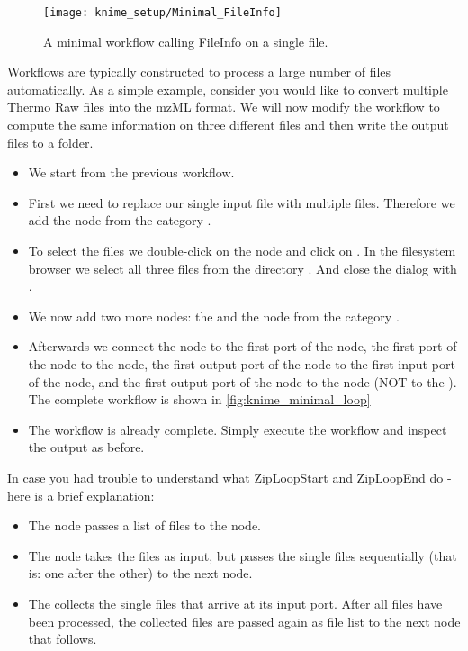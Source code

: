 \begin{figure}
\centering
\texttt{[image: knime\_setup/Minimal\_FileInfo]}
\caption{A minimal workflow calling FileInfo on a single file.}
\label{fig:knime_minimal}
\end{figure}


Workflows are typically constructed to process a large number of files automatically.
As a simple example, consider you would like to convert multiple Thermo Raw files into the mzML format.
We will now modify the workflow to compute the same information on three different files and then write the output files to a folder.

\begin{itemize}
\item
We start from the previous workflow.
\item
First we need to replace our single input file with multiple files.
Therefore we add the  node from the category .
\item
To select the files we double-click on the  node and click on .
In the filesystem browser we select all three files from the directory .
And close the dialog with .
\item
We now add two more nodes: the  and the  node from the category . 
\item
Afterwards we connect the  node to the first port of the  node, the first port of the  node to the  node, the first output port of the  node to the first input port of the  node, and the first output port of the  node to the  node (NOT to the ).
The complete workflow is shown in \cref{fig:knime_minimal_loop}
\item
The workflow is already complete.
Simply execute the workflow and inspect the output as before.
\end{itemize}

In case you had trouble to understand what ZipLoopStart and ZipLoopEnd do - here is a brief explanation:
\begin{itemize}
\item
The   node passes a list of files to the  node.
\item
The  node takes the files as input, but passes the single files sequentially (that is: one after the other) to the next node. 
\item
The  collects the single files that arrive at its input port. After all files have been processed, the collected files are passed again as file list to the next node that follows.
\end{itemize}

